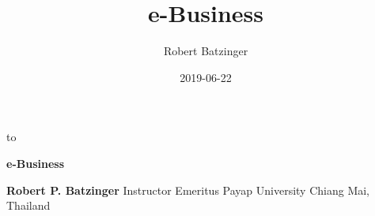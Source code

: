 \documentclass[]{book}
\title{e-Business}
\author{Robert Batzinger}
\date{2019-06-22}
\let\oldmaketitle\maketitle
\begin{document}
\maketitle

\thispagestyle{empty}
\vbox to 
\newpage
\thispagestyle{empty}
\frontmatter
\let\maketitle\oldmaketitle
\vfill
\vfill
\begin{center}
\noindent\LARGE\textbf{e-Business}\parfillskip=0pt\par
\bigskip
\noindent\large\textbf{Robert P. Batzinger}\newline
Instructor Emeritus\newline
Payap University\newline
Chiang Mai, Thailand\parfillskip=0pt\par
\end{center}
\end{document}
